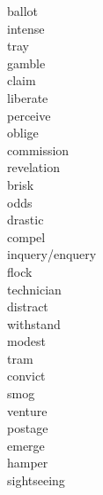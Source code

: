 \documentclass[a4paper, 11pt]{ctexart}
\begin{document}
\begin{multicols*}{3}
\begin{description}
\item[ballot]

\item[intense]

\item[tray]

\item[gamble]

\item[claim]

\item[liberate]

\item[perceive]

\item[oblige]

\item[commission]

\item[revelation]

\item[brisk]

\item[odds]

\item[drastic]

\item[compel]

\item[inquery/enquery]

\item[flock]

\item[technician]

\item[distract]

\item[withstand]

\item[modest]

\item[tram]

\item[convict]

\item[smog]

\item[venture]

\item[postage]

\item[emerge]

\item[hamper]

\item[sightseeing]


\end{description}
\end{multicols*}
\end{document}
